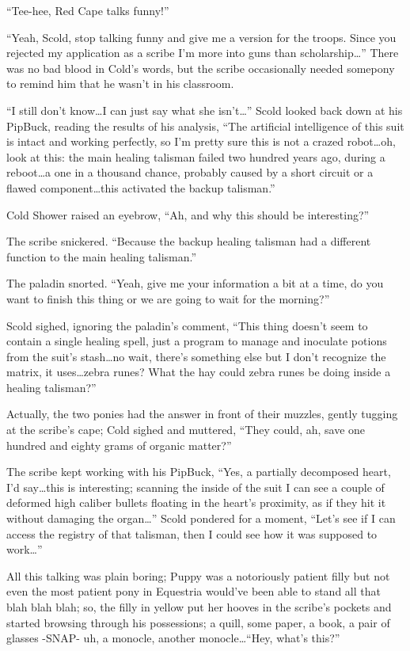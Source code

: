 ``Tee-hee, Red Cape talks funny!''

``Yeah, Scold, stop talking funny and give me a version for the troops. Since you rejected my application as a scribe I'm more into guns than scholarship\dots'' There was no bad blood in Cold's words, but the scribe occasionally needed somepony to remind him that he wasn't in his classroom.

``I still don't know\dots I can just say what she isn't\dots'' Scold looked back down at his PipBuck, reading the results of his analysis, ``The artificial intelligence of this suit is intact and working perfectly, so I'm pretty sure this is not a crazed robot\dots oh, look at this: the main healing talisman failed two hundred years ago, during a reboot\dots a one in a thousand chance, probably caused by a short circuit or a flawed component\dots this activated the backup talisman.''

Cold Shower raised an eyebrow, ``Ah, and why this should be interesting?''

The scribe snickered. ``Because the backup healing talisman had a different function to the main healing talisman.''

The paladin snorted. ``Yeah, give me your information a bit at a time, do you want to finish this thing or we are going to wait for the morning?''

Scold sighed, ignoring the paladin's comment, ``This thing doesn't seem to contain a single healing spell, just a program to manage and inoculate potions from the suit's stash\dots no wait, there's something else but I don't recognize the matrix, it uses\dots zebra runes? What the hay could zebra runes be doing inside a healing talisman?''

Actually, the two ponies had the answer in front of their muzzles, gently tugging at the scribe's cape; Cold sighed and muttered, ``They could, ah, save one hundred and eighty grams of organic matter?''

The scribe kept working with his PipBuck, ``Yes, a partially decomposed heart, I'd say\dots this is interesting; scanning the inside of the suit I can see a couple of deformed high caliber bullets floating in the heart's proximity, as if they hit it without damaging the organ\dots'' Scold pondered for a moment, ``Let's see if I can access the registry of that talisman, then I could see how it was supposed to work\dots''

All this talking was plain boring; Puppy was a notoriously patient filly but not even the most patient pony in Equestria would've been able to stand all that blah blah blah; so, the filly in yellow put her hooves in the scribe's pockets and started browsing through his possessions; a quill, some paper, a book, a pair of glasses -SNAP- uh, a monocle, another monocle\dots ``Hey, what's this?''

